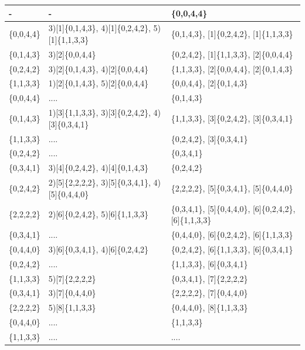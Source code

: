 \documentclass{article}
\begin{document}
\begin{center}
\begin{longtable}{ |p{2cm}|p{2cm}|>{\raggedright\arraybackslash}p{7cm}|  }
    - & - & [0]\{0,0,4,4\} \\ 
    \hline
    [0]\{0,0,4,4\} & 3)[1]\{0,1,4,3\}, 4)[1]\{0,2,4,2\}, 5)[1]\{1,1,3,3\} & [1]\{0,1,4,3\}, [1]\{0,2,4,2\}, [1]\{1,1,3,3\}  \\ 
    \hline
    [1]\{0,1,4,3\} & 3)[2]\{0,0,4,4\} & [1]\{0,2,4,2\}, [1]\{1,1,3,3\}, [2]\{0,0,4,4\} \\ 
    \hline   
    [1]\{0,2,4,2\} & 3)[2]\{0,1,4,3\}, 4)[2]\{0,0,4,4\} & [1]\{1,1,3,3\}, [2]\{0,0,4,4\}, [2]\{0,1,4,3\} \\ 
    \hline
    [1]\{1,1,3,3\} & 1)[2]\{0,1,4,3\}, 5)[2]\{0,0,4,4\} & [2]\{0,0,4,4\}, [2]\{0,1,4,3\} \\ 
    \hline
    [2]\{0,0,4,4\} & .... & [2]\{0,1,4,3\} \\ 
    \hline
    [2]\{0,1,4,3\} & 1)[3]\{1,1,3,3\}, 3)[3]\{0,2,4,2\}, 4)[3]\{0,3,4,1\} & [3]\{1,1,3,3\}, [3]\{0,2,4,2\}, [3]\{0,3,4,1\} \\ 
    \hline
    [3]\{1,1,3,3\} & .... & [3]\{0,2,4,2\}, [3]\{0,3,4,1\} \\ 
    \hline
    [3]\{0,2,4,2\} & .... & [3]\{0,3,4,1\} \\ 
    \hline
    [3]\{0,3,4,1\} & 3)[4]\{0,2,4,2\}, 4)[4]\{0,1,4,3\} & [4]\{0,2,4,2\} \\ 
    \hline
    [4]\{0,2,4,2\} & 2)[5]\{2,2,2,2\}, 3)[5]\{0,3,4,1\}, 4)[5]\{0,4,4,0\} & [5]\{2,2,2,2\}, [5]\{0,3,4,1\}, [5]\{0,4,4,0\} \\ 
    \hline
    [4]\{2,2,2,2\} & 2)[6]\{0,2,4,2\}, 5)[6]\{1,1,3,3\} & [5]\{0,3,4,1\}, [5]\{0,4,4,0\}, [6]\{0,2,4,2\}, [6]\{1,1,3,3\} \\ 
    \hline
    [5]\{0,3,4,1\} & .... & [5]\{0,4,4,0\}, [6]\{0,2,4,2\}, [6]\{1,1,3,3\} \\ 
    \hline
    [5]\{0,4,4,0\} & 3)[6]\{0,3,4,1\}, 4)[6]\{0,2,4,2\} & [6]\{0,2,4,2\}, [6]\{1,1,3,3\}, [6]\{0,3,4,1\} \\ 
    \hline
    [6]\{0,2,4,2\} & .... & [6]\{1,1,3,3\}, [6]\{0,3,4,1\} \\ 
    \hline
    [6]\{1,1,3,3\} & 5)[7]\{2,2,2,2\} & [6]\{0,3,4,1\}, [7]\{2,2,2,2\} \\ 
    \hline
    [6]\{0,3,4,1\} & 3)[7]\{0,4,4,0\} & [7]\{2,2,2,2\}, [7]\{0,4,4,0\} \\ 
    \hline
    [7]\{2,2,2,2\} & 5)[8]\{1,1,3,3\} & [7]\{0,4,4,0\}, [8]\{1,1,3,3\} \\ 
    \hline
    [7]\{0,4,4,0\} & .... & [8]\{1,1,3,3\} \\ 
    \hline
    [8]\{1,1,3,3\} & .... & .... \\ 
    \hline
  \end{longtable}
\end{center}
\end{document}

